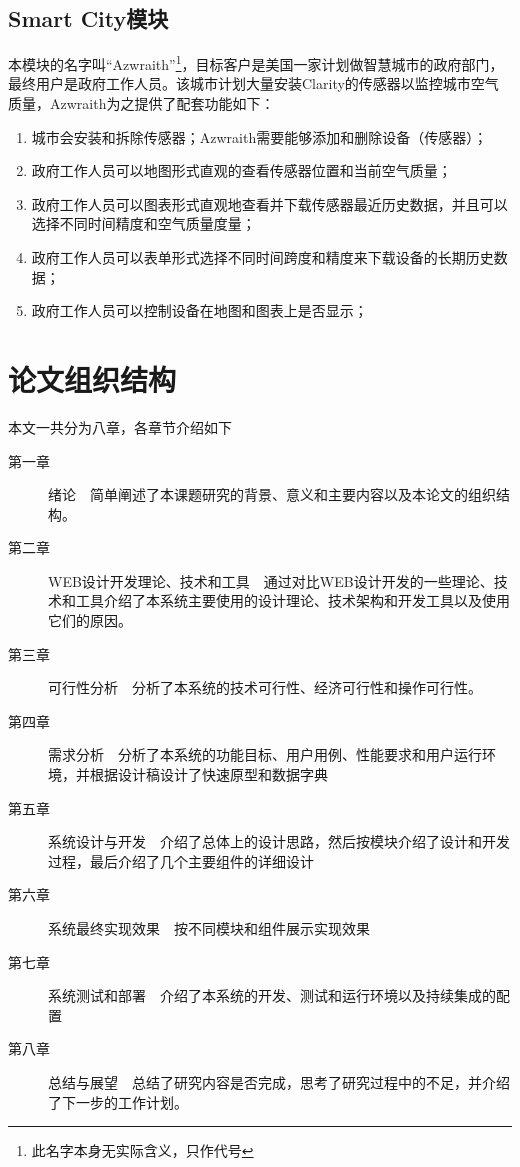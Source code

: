 \subsection{Smart City模块}
本模块的名字叫“Azwraith”\footnote{此名字本身无实际含义，只作代号}，目标客户是美国一家计划做智慧城市的政府部门，最终用户是政府工作人员。该城市计划大量安装Clarity的传感器以监控城市空气质量，Azwraith为之提供了配套功能如下：
\begin{enumerate}
  \item 城市会安装和拆除传感器；Azwraith需要能够添加和删除设备（传感器）；
  \item 政府工作人员可以地图形式直观的查看传感器位置和当前空气质量；
  \item 政府工作人员可以图表形式直观地查看并下载传感器最近历史数据，并且可以选择不同时间精度和空气质量度量；
  \item 政府工作人员可以表单形式选择不同时间跨度和精度来下载设备的长期历史数据；
  \item 政府工作人员可以控制设备在地图和图表上是否显示；
\end{enumerate}


\section{论文组织结构}
本文一共分为八章，各章节介绍如下
\begin{description}
    \item[第一章] 绪论~~简单阐述了本课题研究的背景、意义和主要内容以及本论文的组织结构。
    \item[第二章] WEB设计开发理论、技术和工具~~通过对比WEB设计开发的一些理论、技术和工具介绍了本系统主要使用的设计理论、技术架构和开发工具以及使用它们的原因。
    \item[第三章] 可行性分析~~分析了本系统的技术可行性、经济可行性和操作可行性。
    \item[第四章] 需求分析~~分析了本系统的功能目标、用户用例、性能要求和用户运行环境，并根据设计稿设计了快速原型和数据字典
    \item[第五章] 系统设计与开发~~介绍了总体上的设计思路，然后按模块介绍了设计和开发过程，最后介绍了几个主要组件的详细设计
    \item[第六章] 系统最终实现效果~~按不同模块和组件展示实现效果
    \item[第七章] 系统测试和部署~~介绍了本系统的开发、测试和运行环境以及持续集成的配置
    \item[第八章] 总结与展望~~总结了研究内容是否完成，思考了研究过程中的不足，并介绍了下一步的工作计划。
\end{description}
